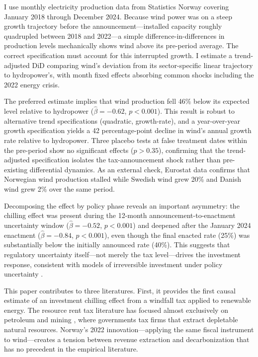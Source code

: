 \documentclass[12pt]{article}
\begin{document}
I use monthly electricity production data from Statistics Norway covering January 2018 through December 2024. Because wind power was on a steep growth trajectory before the announcement---installed capacity roughly quadrupled between 2018 and 2022---a simple difference-in-differences in production levels mechanically shows wind above its pre-period average. The correct specification must account for this interrupted growth. I estimate a trend-adjusted DiD comparing wind's deviation from its sector-specific linear trajectory to hydropower's, with month fixed effects absorbing common shocks including the 2022 energy crisis.

The preferred estimate implies that wind production fell 46\% below its expected level relative to hydropower ($\hat{\beta} = -0.62$, $p < 0.001$). This result is robust to alternative trend specifications (quadratic, growth-rate), and a year-over-year growth specification yields a 42 percentage-point decline in wind's annual growth rate relative to hydropower. Three placebo tests at false treatment dates within the pre-period show no significant effects ($p > 0.35$), confirming that the trend-adjusted specification isolates the tax-announcement shock rather than pre-existing differential dynamics. As an external check, Eurostat data confirms that Norwegian wind production stalled while Swedish wind grew 20\% and Danish wind grew 2\% over the same period.

Decomposing the effect by policy phase reveals an important asymmetry: the chilling effect was present during the 12-month announcement-to-enactment uncertainty window ($\hat{\beta} = -0.52$, $p < 0.001$) and deepened after the January 2024 enactment ($\hat{\beta} = -0.84$, $p < 0.001$), even though the final enacted rate (25\%) was substantially below the initially announced rate (40\%). This suggests that regulatory uncertainty itself---not merely the tax level---drives the investment response, consistent with models of irreversible investment under policy uncertainty \citep{dixit1994investment, hassett1999investment}.

This paper contributes to three literatures. First, it provides the first causal estimate of an investment chilling effect from a windfall tax applied to renewable energy. The resource rent tax literature has focused almost exclusively on petroleum and mining \citep{boadway2001rents, daniel2010evaluating, mintz2010resource}, where governments tax firms that extract depletable natural resources. Norway's 2022 innovation---applying the same fiscal instrument to wind---creates a tension between revenue extraction and decarbonization that has no precedent in the empirical literature.
\end{document}
